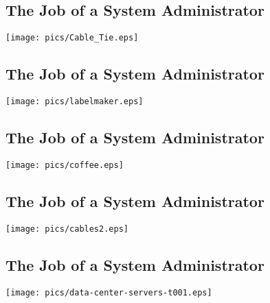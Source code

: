 \documentclass[xga]{xdvislides}
\begin{document}
\subsection{The Job of a System Administrator}
\vspace*{\fill}
\begin{center}
	\texttt{[image: pics/Cable\_Tie.eps]} \\
\end{center}
\vspace*{\fill}

\subsection{The Job of a System Administrator}
\vspace*{\fill}
\begin{center}
	\texttt{[image: pics/labelmaker.eps]} \\
\end{center}
\vspace*{\fill}

\subsection{The Job of a System Administrator}
\vspace*{\fill}
\begin{center}
	\texttt{[image: pics/coffee.eps]} \\
\end{center}
\vspace*{\fill}

\subsection{The Job of a System Administrator}
\vspace*{\fill}
\begin{center}
	\texttt{[image: pics/cables2.eps]} \\
\end{center}
\vspace*{\fill}

\subsection{The Job of a System Administrator}
\vspace*{\fill}
\begin{center}
	\texttt{[image: pics/data-center-servers-t001.eps]} \\
\end{center}
\vspace*{\fill}
\end{document}
